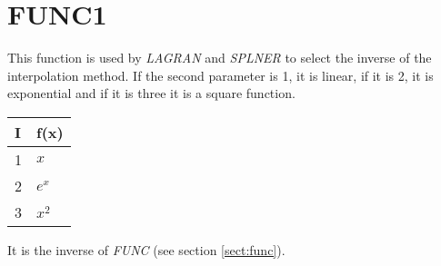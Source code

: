 \section{FUNC1}
\label{sect:func1}

\noindent This function is used by {\em LAGRAN} and {\em SPLNER} to select
the inverse of the interpolation method. If the second parameter is 1, it is
linear, if it is 2, it is exponential and if it is three it is a square
function.

\begin{tabular}{|ll|}
\hline
I & f(x)\\
\hline
1 & $x$\\
2 & $e^x$\\
3 & $x^2$\\
\hline
\end{tabular}

\noindent It is the inverse of {\em FUNC} (see section \ref{sect:func}).\\
